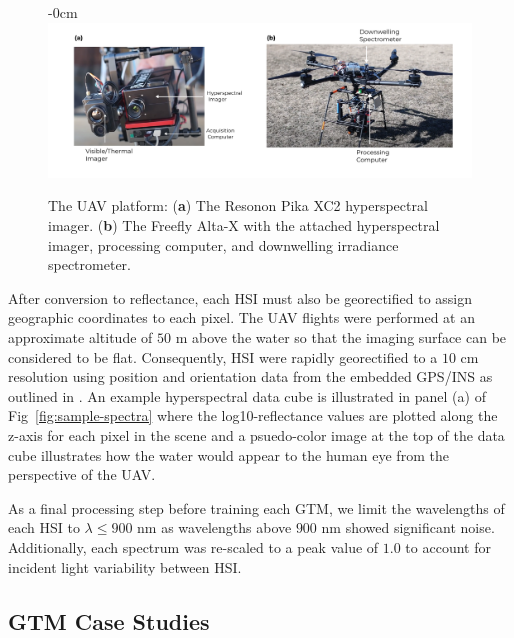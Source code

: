 \documentclass[remotesensing,article,submit,pdftex,moreauthors]{Definitions/mdpi}
\begin{document}
\begin{figure}[t]
\begin{adjustwidth}{-\extralength}{0cm}
\centering
\includegraphics[width=15.5cm]{paper/figures/methods/annotated-drone.pdf}
\end{adjustwidth}
\caption{The UAV platform: (\textbf{a}) The Resonon Pika XC2 hyperspectral imager. (\textbf{b}) The Freefly Alta-X with the attached hyperspectral imager, processing computer, and downwelling irradiance spectrometer. \label{fig:drone}}
\end{figure}  




After conversion to reflectance, each HSI must also be georectified to assign geographic coordinates to each pixel. The UAV flights were performed at an approximate altitude of $50$ m above the water so that the imaging surface can be considered to be flat. Consequently, HSI were rapidly georectified to a $10$ cm resolution using position and orientation data from the embedded GPS/INS as outlined in \cite{muller2002program, baumker2001new, mostafa2000multi}. An example hyperspectral data cube is illustrated in panel (a) of Fig~\ref{fig:sample-spectra} where the log10-reflectance values are plotted along the z-axis for each pixel in the scene and a psuedo-color image at the top of the data cube illustrates how the water would appear to the human eye from the perspective of the UAV.

As a final processing step before training each GTM, we limit the wavelengths of each HSI to $\lambda \leq 900$ nm as wavelengths above $900$ nm showed significant noise. Additionally, each spectrum was re-scaled to a peak value of $1.0$ to account for incident light variability between HSI.

\subsection{GTM Case Studies}\label{sec:case-studies}
\end{document}
